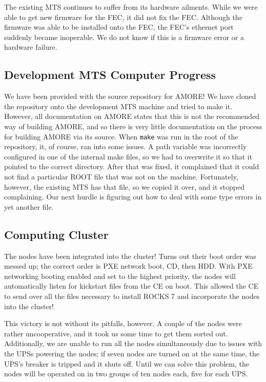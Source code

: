 \documentclass[12pt]{article}
\newcommand\tab[1][1cm]{\hspace*{#1}}
\begin{document}
\tab The existing MTS continues to suffer from its hardware ailments. While we
were able to get new firmware for the FEC, it did not fix the FEC. Although the
firmware was able to be installed onto the FEC, the FEC's ethernet port suddenly
became inoperable. We do not know if this is a firmware error or a hardware
failure.

\subsection{Development MTS Computer Progress}

\tab We have been provided with the source repository for AMORE! We have cloned
the repository onto the development MTS machine and tried to make it. However,
all documentation on AMORE states that this is not the recommended way of
building AMORE, and so there is very little documentation on the process for
building AMORE via its source. When {\tt make} was run in the root of the
repository, it, of course, ran into some issues. A path variable was incorrectly
configured in one of the internal make files, so we had to overwrite it so that
it pointed to the correct directory. After that was fixed, it complained that it
could not find a particular ROOT file that was not on the machine. Fortunately,
however, the existing MTS has that file, so we copied it over, and it stopped
complaining. Our next hurdle is figuring out how to deal with some type errors
in yet another file.

\subsection{Computing Cluster}

\tab The nodes have been integrated into the cluster! Turns out their boot order
was messed up; the correct order is PXE network boot, CD, then HDD. With PXE
networking booting enabled and set to the highest priority, the nodes will
automatically listen for kickstart files from the CE on boot. This allowed the
CE to send over all the files necessary to install ROCKS 7 and incorporate the
nodes into the cluster! 

\tab This victory is not without its pitfalls, however. A couple of the nodes
were rather uncooperative, and it took us some time to get them sorted
out. Additionally, we are unable to run all the nodes simultaneously due to
issues with the UPSs powering the nodes; if seven nodes are turned on at the
same time, the UPS's breaker is tripped and it shuts off. Until we can solve
this problem, the nodes will be operated on in two groups of ten nodes each,
five for each UPS.
\end{document}
